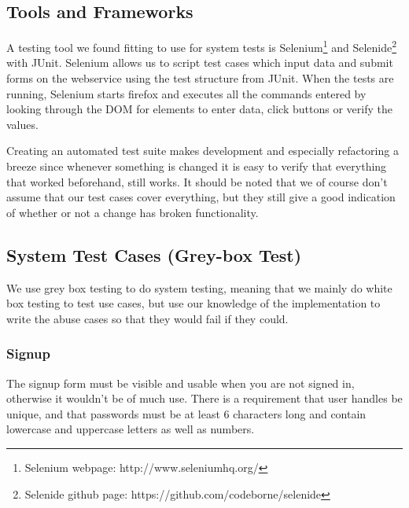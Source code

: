 \documentclass[a4paper]{article}
\begin{document}
%
%
%
%
%
%
%
\subsection{Tools and Frameworks}
A testing tool we found fitting to use for system tests is Selenium\footnote{Selenium webpage: http://www.seleniumhq.org/} and Selenide\footnote{Selenide github page: https://github.com/codeborne/selenide} with JUnit. Selenium allows us to script test cases which input data and submit forms on the webservice using the test structure from JUnit.
When the tests are running, Selenium starts firefox and executes all the commands entered by looking through the DOM for elements to enter data, click buttons or verify the values.

Creating an automated test suite makes development and especially refactoring a breeze since whenever something is changed it is easy to verify that everything that worked beforehand, still works. It should be noted that we of course don't assume that our test cases cover everything, but they still give a good indication of whether or not a change has broken functionality.

\subsection{System Test Cases (Grey-box Test)}
We use grey box testing to do system testing, meaning that we mainly do white box testing to test use cases, but use our knowledge of the implementation to write the abuse cases so that they would fail if they could.

\subsubsection{Signup}
The signup form must be visible and usable when you are not signed in, otherwise it wouldn't be of much use. There is a requirement that user handles be unique, and that passwords must be at least 6 characters long and contain lowercase and uppercase letters as well as numbers.
\end{document}
